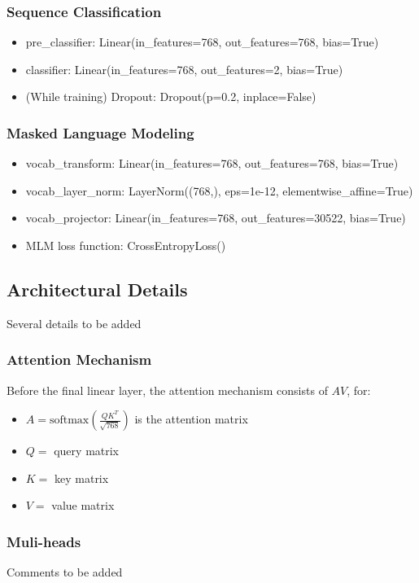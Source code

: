 \documentclass{article}
\begin{document}
	\subsubsection*{Sequence Classification}
	
	\begin{itemize}
		\item pre\_classifier: Linear(in\_features=768, out\_features=768, bias=True)
		\item classifier: Linear(in\_features=768, out\_features=2, bias=True)
		\item (While training) Dropout: Dropout(p=0.2, inplace=False)
	\end{itemize}
	
	\subsubsection*{Masked Language Modeling}
	
	\begin{itemize}
		\item vocab\_transform: Linear(in\_features=768, out\_features=768, bias=True)
		\item vocab\_layer\_norm: LayerNorm((768,), eps=1e-12, elementwise\_affine=True)
		\item vocab\_projector: Linear(in\_features=768, out\_features=30522, bias=True)
		\item MLM loss function: CrossEntropyLoss()
	\end{itemize}
	
	\subsection{Architectural Details}
	
	Several details to be added
	
	\subsubsection{Attention Mechanism}
	
	Before the final linear layer, the attention mechanism consists of $AV$, for:
	
	\begin{itemize}
		\item $A = \text{softmax}\left(\frac{QK^T}{\sqrt{768}}\right)$ is the attention matrix
		\item $Q =$ query matrix 
		\item $K =$ key matrix
		\item $V =$ value matrix
	\end{itemize}
	
	\subsubsection*{Muli-heads}
	
	Comments to be added
	
	
	
	
	
	
\end{document}
